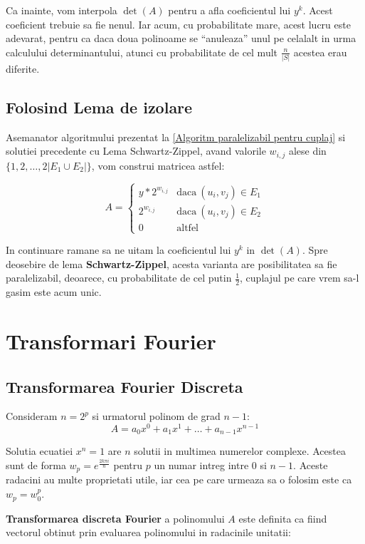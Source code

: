 Ca inainte, vom interpola $\det(A)$ pentru a afla coeficientul lui $y^{k}$.
Acest coeficient trebuie sa fie nenul. Iar acum, cu probabilitate mare, acest
lucru este adevarat, pentru ca daca doua polinoame se ``anuleaza'' unul pe
celalalt in urma calculului determinantului, atunci cu probabilitate de cel mult
$\frac{n}{|S|}$ acestea erau diferite.

\subsection{Folosind Lema de izolare}
Asemanator algoritmului prezentat la \ref{Algoritm paralelizabil pentru cuplaj}
si solutiei precedente cu Lema Schwartz-Zippel, avand valorile $w_{i,j}$ alese
din $\{1, 2, \ldots, 2|E_{1} \cup E_{2}|\}$, vom construi matricea astfel:

\begin{equation}
  A=
  \begin{cases}
    y * 2^{w_{i,j}} & \text{daca}\ (u_{i}, v_{j}) \in E_{1} \\
    2^{w_{i,j}} & \text{daca}\ (u_{i}, v_{j}) \in E_{2} \\
    0 & \text{altfel}
  \end{cases}
\end{equation}

In continuare ramane sa ne uitam la coeficientul lui $y^{k}$ in $\det(A)$. Spre
deosebire de lema \textbf{Schwartz-Zippel}, acesta varianta are posibilitatea sa fie
paralelizabil, deoarece, cu probabilitate de cel putin $\frac{1}{2}$, cuplajul
pe care vrem sa-l gasim este acum unic.

\pagebreak

\section{Transformari Fourier}

\subsection{Transformarea Fourier Discreta}
Consideram $n = 2^{p}$ si urmatorul polinom de grad $n-1$:
\begin{equation}
  A = a_{0}x^{0} + a_{1}x^{1} + \ldots + a_{n-1}x^{n-1}
\end{equation}

Solutia ecuatiei $x^{n} = 1$ are $n$ solutii in multimea numerelor complexe.
Acestea sunt de forma $w_{p} = e^{\frac{2k\pi i}{n}}$ pentru $p$ un numar intreg
intre $0$ si $n-1$. Aceste radacini au multe proprietati utile, iar cea pe care
urmeaza sa o folosim este ca $w_{p} = w_{0}^{p}$. \par
\textbf{Transformarea discreta Fourier} a polinomului $A$ este definita ca fiind
vectorul obtinut prin evaluarea polinomului in radacinile unitatii:

